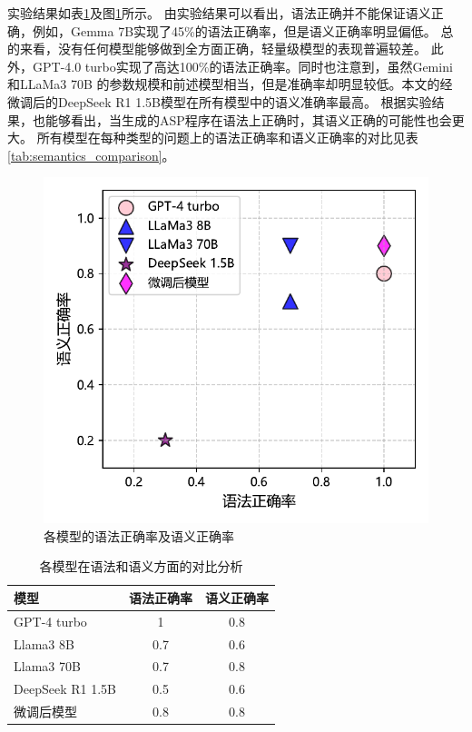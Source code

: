 实验结果如表\ref{fig:overall_syntactics_semantics}及图\ref{fig:syntactics_and_semantics}所示。
由实验结果可以看出，语法正确并不能保证语义正确，例如，Gemma 7B实现了45\%的语法正确率，但是语义正确率明显偏低。
总的来看，没有任何模型能够做到全方面正确，轻量级模型的表现普遍较差。
此外，GPT-4.0 turbo实现了高达100\%的语法正确率。同时也注意到，虽然Gemini和LLaMa3 70B
的参数规模和前述模型相当，但是准确率却明显较低。本文的经微调后的DeepSeek R1 1.5B模型在所有模型中的语义准确率最高。
根据实验结果，也能够看出，当生成的ASP程序在语法上正确时，其语义正确的可能性也会更大。
所有模型在每种类型的问题上的语法正确率和语义正确率的对比见表\ref{tab:semantics_comparison}。
\begin{figure}
    \centering
    \includegraphics{figures/syntactics_and_semantics.pdf}
    \caption{各模型的语法正确率及语义正确率}
    \label{fig:syntactics_and_semantics}
\end{figure}
\begin{table}
    \centering
    \begin{tabular}{lcc}
        \toprule
        \textbf{模型} & \textbf{语法正确率} & \textbf{语义正确率} \\
        \midrule
        GPT-4 turbo & 1 & 0.8 \\
        Llama3 8B & 0.7 & 0.6 \\
        Llama3 70B & 0.7 & 0.8 \\
        DeepSeek R1 1.5B & 0.5 & 0.6 \\
        \midrule
        微调后模型 & 0.8 & 0.8 \\
        \bottomrule
    \end{tabular}
    \caption{各模型在语法和语义方面的对比分析}
    \label{fig:overall_syntactics_semantics}
\end{table}
